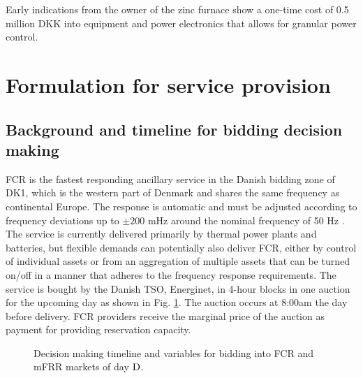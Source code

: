 \documentclass[conference]{IEEEtran}
\begin{document}
Early indications from the owner of the zinc furnace show a one-time cost of 0.5 million DKK into equipment and power electronics that allows for granular power control.

\vspace{1mm}
\section{Formulation for service provision} 
\label{opt}
\vspace{-1mm}
\subsection{Background and timeline for bidding decision making}
\vspace{-1mm}
FCR is the fastest responding ancillary service in the Danish bidding zone of DK1, which is the western part of Denmark and shares the same frequency as continental Europe. The response is automatic and must be adjusted according to frequency deviations up to $\pm 200$ mHz around the nominal frequency of 50 Hz \cite{energinet:prequalification}. The service is currently delivered primarily by thermal power plants and batteries, but flexible demands can potentially also deliver FCR, either by control of individual assets or from an aggregation of multiple assets that can be turned on/off in a manner that adheres to the frequency response requirements. The service is bought by the Danish TSO, Energinet, in 4-hour blocks in one auction for the upcoming day as shown in Fig. \ref{fig:timeline}. The auction occurs at 8:00am the day before delivery. FCR providers receive the marginal price of the auction as payment for providing reservation capacity.

\begin{figure}
    \begin{adjustbox}{width=\columnwidth}
        
    \end{adjustbox}
    \caption{\small{Decision making timeline and variables for bidding into FCR and mFRR markets of day $\rm{D}$. %
    \vspace{-3mm}}}
    \label{fig:timeline}
\end{figure}
\end{document}
